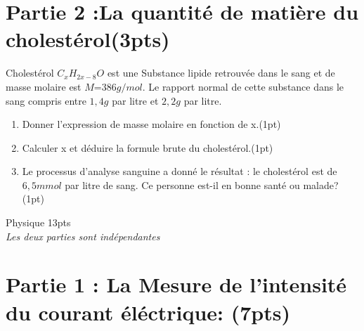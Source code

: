 \documentclass[12pt]{article}
\begin{document}
\section*{Partie 2 :La quantité de matière du cholestérol\dotfill(3pts) }
Cholestérol $C_xH_{2x-8}O$ est une Substance lipide retrouvée dans le sang et de masse molaire est $M$=$386g/mol$. Le rapport normal de cette substance dans le sang compris entre $1,4g$ par litre et $2,2g$ par litre.
\begin{enumerate}
    \item Donner l'expression de masse molaire en fonction de x.\dotfill(1pt)
    \item Calculer x et déduire la formule brute du cholestérol.\dotfill(1pt)
    \item Le processus d'analyse sanguine a donné le résultat : le cholestérol est de $6,5mmol$ par litre de sang. Ce personne est-il en bonne santé ou malade?\dotfill(1pt)
\end{enumerate}

\begin{center}
    \vspace{1cm}
\hrulefill
\Large{Physique 13pts}
\hrulefill\\
    \emph{Les deux parties sont indépendantes}
\end{center}
\section*{Partie 1 : La Mesure de l’intensité du courant éléctrique: \dotfill(7pts)}

\end{document}
